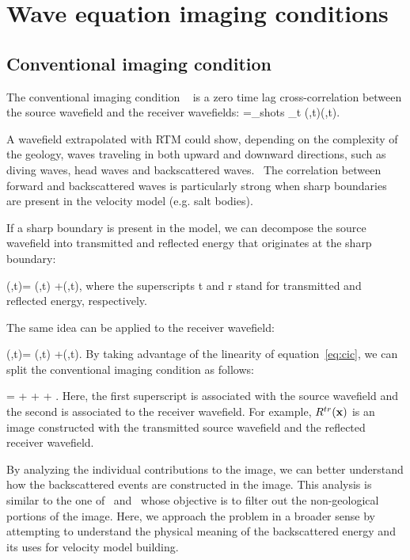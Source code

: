 \section{Wave equation imaging conditions}




\subsection{Conventional imaging condition}
The conventional imaging condition ~\citep{Claerbout:1985:IEI:3887}
is a zero time lag cross-correlation between the source wavefield and the 
receiver wavefields:
%
\beq
\R=\sum_{shots} \sum_{t} \US(\xx,t)\UR(\xx,t).
\label{eq:cic}
\eeq

A wavefield extrapolated with RTM could show, depending on the complexity of the geology, waves traveling in both
upward and downward directions, such as diving waves, head waves and backscattered waves.~
The correlation between forward and backscattered waves is particularly strong when
sharp boundaries are present in the velocity model (e.g. salt bodies).

If a sharp boundary is present in the model, we can decompose the source wavefield into transmitted 
 and reflected energy that originates at the sharp boundary:

\beq
\US(\xx,t)= \USr(\xx,t) +\USt(\xx,t),
\label{eq:ssplit}
\eeq
%
where the superscripts t and r stand for transmitted and reflected energy, respectively. 

The same idea can be applied to the receiver wavefield:

\beq
\UR(\xx,t)= \URr(\xx,t) +\URt(\xx,t).
\label{eq:rsplit}
\eeq
%
By taking advantage of the linearity of equation~\ref{eq:cic},  we
can split the conventional imaging condition as follows:

\beq
 \R =  + + + .
\label{eq:cicsplit}
\eeq
%
Here, the first superscript is associated with the source wavefield and the second is associated to the
receiver wavefield. For example, $R^{tr}({\bf x})$ is an image constructed with the transmitted source wavefield
and the reflected receiver wavefield.

By analyzing the individual contributions to the image, we can better understand how the backscattered events
are constructed in the image. This analysis is similar to the one of~\cite{fei:3130} and~\cite{liu:S29}
whose objective is to filter out the non-geological portions of the image. Here, we approach the problem 
in a broader sense by attempting to understand the physical meaning of the backscattered energy and its
uses for velocity model building.



